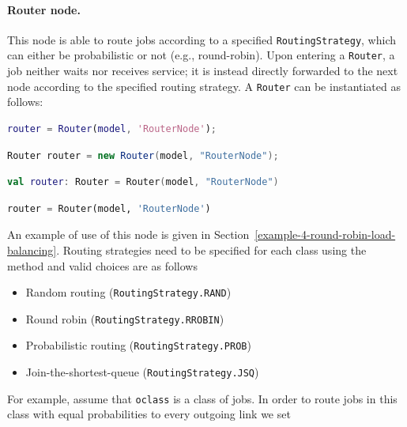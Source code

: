 \paragraph{Router node.} This node is able to route jobs according to a specified \texttt{RoutingStrategy}, which can either be probabilistic or not (e.g., round-robin). Upon entering a \texttt{Router}, a job neither waits nor receives service; it is instead directly forwarded to the next node according to the specified routing strategy. A \texttt{Router} can be instantiated as follows:
\begin{MATLAB}
\begin{lstlisting}[language = matlab]
router = Router(model, 'RouterNode');
\end{lstlisting}
\end{MATLAB}
\begin{JAVA}
\begin{lstlisting}[language = java, basicstyle=\ttfamily\scriptsize]
Router router = new Router(model, "RouterNode");
\end{lstlisting}
\end{JAVA}
\begin{KOTLIN}
\begin{lstlisting}[language = kotlin, basicstyle=\ttfamily\scriptsize]
val router: Router = Router(model, "RouterNode")
\end{lstlisting}
\end{KOTLIN}
\begin{PYTHON}
\begin{lstlisting}[language = python]
router = Router(model, 'RouterNode')
\end{lstlisting}
\end{PYTHON}
An example of use of this node is given in Section~\ref{example-4-round-robin-load-balancing}. Routing strategies need to be specified for each class using the  method and valid choices are as follows
\begin{itemize}
\item Random routing (\texttt{RoutingStrategy.RAND})
\item Round robin (\texttt{RoutingStrategy.RROBIN})
\item Probabilistic routing (\texttt{RoutingStrategy.PROB})
\item Join-the-shortest-queue (\texttt{RoutingStrategy.JSQ})
\end{itemize}
For example, assume that \texttt{oclass} is a class of jobs. In order to route jobs in this class with equal probabilities to every outgoing link we set
